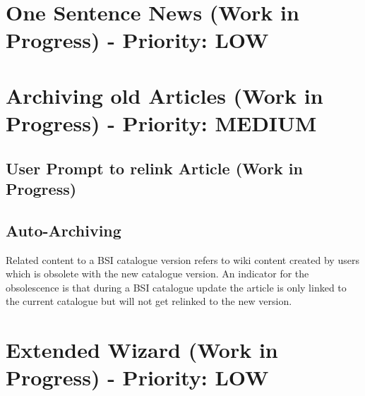 \section{One Sentence News (Work in Progress) - Priority: LOW}



\section{Archiving old Articles (Work in Progress) - Priority: MEDIUM}
\subsection{User Prompt to relink Article (Work in Progress)}

\subsection{Auto-Archiving}
\label{archive_relcon}
Related content to a BSI catalogue version refers to wiki content created by users which is obsolete with the new catalogue version. 
An indicator for the obsolescence is that during a BSI catalogue update the article is only linked to the current catalogue but will not get relinked to the new version.


\section{Extended Wizard (Work in Progress) - Priority: LOW}

